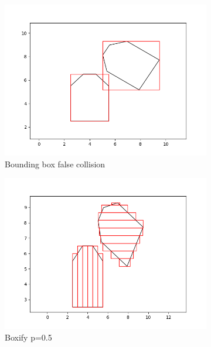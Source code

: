 \documentclass[a4paper,12pt]{article}
\DeclareRobustCommand{\[}{\begin{equation}}
\DeclareRobustCommand{\]}{\end{equation}}
\numberwithin{equation}{section}
\numberwithin{algorithm}{subsection}
\begin{document}
\begin{figure}[H]
\centering
    \begin{subfigure}[b]{0.4\textwidth}
        \includegraphics[scale=0.3,width=\textwidth]{images/car_bounding_box.png}
        \caption{Bounding box false collision}
    \end{subfigure}
    \begin{subfigure}[b]{0.4\textwidth}
        \includegraphics[scale=0.3,width=\textwidth]{images/car_boxify_0_5.png}
        \caption{Boxify p=0.5}
    \end{subfigure}
    \begin{subfigure}[b]{0.4\textwidth}

\end{subfigure}
\end{figure}
\end{document}
